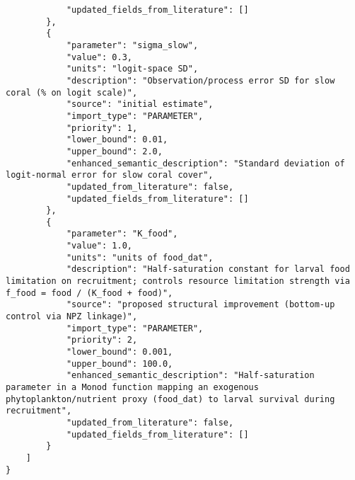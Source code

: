 \begin{lstlisting}
            "updated_fields_from_literature": []
        },
        {
            "parameter": "sigma_slow",
            "value": 0.3,
            "units": "logit-space SD",
            "description": "Observation/process error SD for slow coral (% on logit scale)",
            "source": "initial estimate",
            "import_type": "PARAMETER",
            "priority": 1,
            "lower_bound": 0.01,
            "upper_bound": 2.0,
            "enhanced_semantic_description": "Standard deviation of logit-normal error for slow coral cover",
            "updated_from_literature": false,
            "updated_fields_from_literature": []
        },
        {
            "parameter": "K_food",
            "value": 1.0,
            "units": "units of food_dat",
            "description": "Half-saturation constant for larval food limitation on recruitment; controls resource limitation strength via f_food = food / (K_food + food)",
            "source": "proposed structural improvement (bottom-up control via NPZ linkage)",
            "import_type": "PARAMETER",
            "priority": 2,
            "lower_bound": 0.001,
            "upper_bound": 100.0,
            "enhanced_semantic_description": "Half-saturation parameter in a Monod function mapping an exogenous phytoplankton/nutrient proxy (food_dat) to larval survival during recruitment",
            "updated_from_literature": false,
            "updated_fields_from_literature": []
        }
    ]
}
\end{lstlisting}
